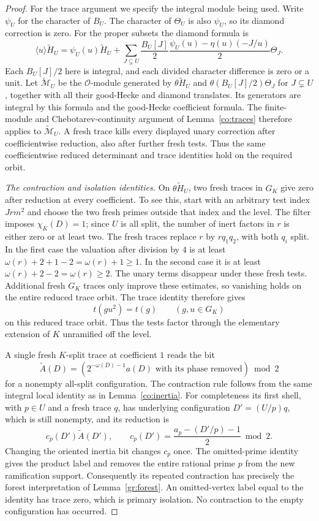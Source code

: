 \begin{proof}
For the trace argument we specify the integral module being used.
Write $\psi_U$ for the character of $B_U$.  The character of $\Theta_U$
is also $\psi_U$, so its diamond correction is zero.  For the proper
subsets the diamond formula is
\[
 \langle u\rangle\widetilde H_U
 =\psi_U(u)\widetilde H_U+
 \sum_{J\subsetneq U}\frac{B_U[J]}2
 \frac{\psi_U(u)-\eta(u)(-J/u)}2\Theta_J.
\]
Each $B_U[J]/2$ here is integral, and each divided character difference
is zero or a unit.  Let $\widetilde{\mathcal M}_U$ be the $\mathcal O$-module
generated by $\theta\widetilde H_U$ and
$\theta(B_U[J]/2)\Theta_J$ for $J\subsetneq U$, together with all their
good-Hecke and diamond translates.  Its generators are integral by this
formula and the good-Hecke coefficient formula.  The finite-module and
Chebotarev-continuity argument of Lemma~\ref{co:traces} therefore applies
to $\widetilde{\mathcal M}_U$.  A fresh trace kills every displayed unary
correction after coefficientwise reduction, also after further fresh
tests.  Thus the same coefficientwise reduced determinant and trace
identities hold on the required orbit.

\emph{The contraction and isolation identities.}
On $\theta\widetilde H_U$, two fresh traces in $G_K$ give zero after
reduction at every coefficient.  To see this, start with an arbitrary
test index $Jrm^2$ and choose the two fresh primes outside that index
and the level.  The filter imposes $\chi_K(D)=1$; since $U$ is all split,
the number of inert factors in $r$ is either zero or at least two.
The fresh traces replace $r$ by $rq_1q_2$, with both $q_i$ split.
In the first case the valuation after division by $4$ is at least
$\omega(r)+2+1-2=\omega(r)+1\ge1$.  In the second case it is at least
$\omega(r)+2-2=\omega(r)\ge2$.  The unary terms disappear under these
fresh tests.  Additional fresh $G_K$ traces only improve these estimates,
so vanishing holds on the entire reduced trace orbit.  The trace identity
therefore gives
\[
 t(gu^2)=t(g)\qquad(g,u\in G_K)
\]
on this reduced trace orbit.  Thus the tests factor through the elementary
extension of $K$ unramified off the level.

A single fresh $K$-split trace at coefficient $1$ reads the bit
\begin{equation}\label{pw:deeper-bit}
 \widetilde A(D)=
 \left(2^{-\omega(D)-1}a(D)\text{ with its phase removed}\right)\bmod2
\end{equation}
for a nonempty all-split configuration.  The contraction rule follows
from the same integral local identity as in Lemma~\ref{co:inertia}.
For completeness its first shell, with $p\in U$ and a fresh trace $q$,
has underlying configuration $D'=(U/p)q$, which is still nonempty, and
its reduction is
\[
 c_p(D')\widetilde A(D'),\qquad
 c_p(D')=\frac{a_p-(D'/p)-1}{2}\bmod2.
\]
Changing the oriented inertia bit changes $c_p$ once.  The omitted-prime
identity gives the product label and removes the entire rational prime
$p$ from the new ramification support.  Consequently its repeated
contraction has precisely the forest interpretation of
Lemma~\ref{gr:forest}.  An omitted-vertex label equal to the identity has
trace zero, which is primary isolation.  No contraction to the empty
configuration has occurred.


\end{proof}
